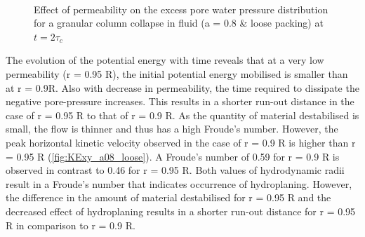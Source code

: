 \begin{figure}
\centering
{}\\
\caption{Effect of permeability on the excess pore water pressure distribution 
for a granular column collapse in fluid (a = 0.8 \& loose packing) at $t = 
2\tau_c$}
\label{fig:Loose_PWP_flow}
\end{figure}

The evolution of the potential energy with time reveals that at a very low 
permeability (r = 0.95 R), the initial potential energy mobilised is smaller 
than at r = 0.9R. Also with decrease in permeability, the time required to 
dissipate the negative pore-pressure increases. This results in a shorter 
run-out distance in the case of r = 0.95 R to that of r = 0.9 R. As the 
quantity of material destabilised is small, the flow is thinner and thus has a 
high Froude's number. However, the peak horizontal kinetic velocity observed in 
the case of r = 0.9 R is higher than r = 0.95 R 
(\cref{fig:KExy_a08_loose}).  A Froude's number of 0.59 for r = 0.9 R is 
observed in contrast to 0.46 for r = 0.95 R. Both values of hydrodynamic radii 
result in a Froude's number that indicates occurrence of hydroplaning. However, 
the difference in the amount of material destabilised for r = 0.95 R and the 
decreased effect of hydroplaning results in a shorter run-out distance for r = 
0.95 R in comparison to r = 0.9 R. 


